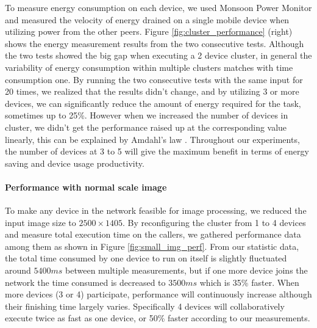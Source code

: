 \documentclass{sig-alternate}[10pt]
\begin{document}
To measure energy consumption on each device, we used Monsoon Power Monitor \cite{moosoon} and measured the velocity of energy drained on a single mobile device when utilizing power from the other peers. Figure \ref{fig:cluster_performance} (right) shows the energy measurement results from the two consecutive tests. Although the two tests showed the big gap when executing a 2 device cluster, in general the variability of energy consumption within multiple clusters matches with time consumption one. By running the two consecutive tests with the same input for 20 times, we realized that the results didn't change, and by utilizing 3 or more devices, we can significantly reduce the amount of energy required for the task, sometimes up to 25\%. However when we increased the number of devices in cluster, we didn't get the performance raised up at the corresponding value linearly, this can be explained by Amdahl's law \cite{amdahl}. Throughout our experiments, the number of devices at 3 to 5 will give the maximum benefit in terms of energy saving and device usage productivity.

\paragraph{Performance with normal scale image}
To make any device in the network feasible for image processing, we reduced the input image size to $2500 \times 1405$. By reconfiguring the cluster from 1 to 4 devices and measure total execution time on the callers, we gathered performance data among them as shown in Figure \ref{fig:small_img_perf}. From our statistic data, the total time consumed by one device to run on itself is slightly fluctuated around $5400ms$ between multiple measurements, but if one more device joins the network the time consumed is decreased to $3500ms$ which is 35\% faster. When more devices (3 or 4) participate, performance will continuously increase although their finishing time largely varies. Specifically 4 devices will collaboratively execute twice as fast as one device, or 50\% faster according to our measurements.
\end{document}
